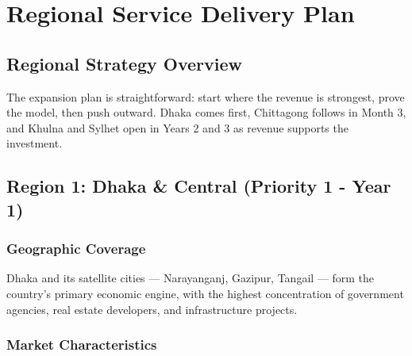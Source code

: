 
\chapter{Regional Service Delivery Plan}

\section{Regional Strategy Overview}

The expansion plan is straightforward: start where the revenue is strongest, prove the model, then push outward. Dhaka comes first, Chittagong follows in Month 3, and Khulna and Sylhet open in Years 2 and 3 as revenue supports the investment.

\section{Region 1: Dhaka \& Central (Priority 1 - Year 1)}

\subsection{Geographic Coverage}

Dhaka and its satellite cities --- Narayanganj, Gazipur, Tangail --- form the country's primary economic engine, with the highest concentration of government agencies, real estate developers, and infrastructure projects.

\subsection{Market Characteristics}

